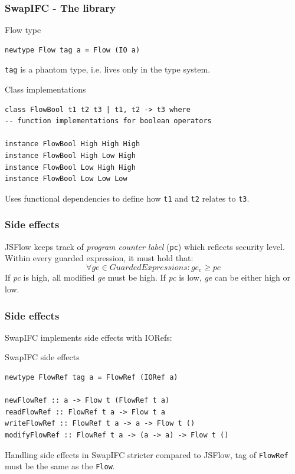 \documentclass{beamer}
\begin{document}
\begin{frame}[fragile]
  \frametitle{SwapIFC - The library}
  \begin{block}{Flow type}
\begin{verbatim}
newtype Flow tag a = Flow (IO a)
\end{verbatim}
  \end{block}
  {\tt tag} is a phantom type, i.e. lives only in the type system. \pause
  \begin{block}{Class implementations}
\begin{verbatim}
class FlowBool t1 t2 t3 | t1, t2 -> t3 where
-- function implementations for boolean operators

instance FlowBool High High High
instance FlowBool High Low High
instance FlowBool Low High High
instance FlowBool Low Low Low
\end{verbatim}
  \end{block}
  Uses functional dependencies to define how {\tt t1} and {\tt t2} relates to {\tt t3}.
\end{frame}


\begin{frame}
  \frametitle{Side effects}
  JSFlow keeps track of \emph{program counter label} ({\tt pc}) which reflects security level. \pause
  \newline
  Within every guarded expression, it must hold that:\[ \forall ge \in GuardedExpressions: ge_c \geq pc \] \pause
  If \emph{pc} is high, all modified \emph{ge} must be high. If \emph{pc} is low, \emph{ge} can be either high or low.
\end{frame}


\begin{frame}[fragile]
  \frametitle{Side effects}
  SwapIFC implements side effects with IORefs:
  \begin{block}{SwapIFC side effects}
\begin{verbatim}
newtype FlowRef tag a = FlowRef (IORef a)

newFlowRef :: a -> Flow t (FlowRef t a)
readFlowRef :: FlowRef t a -> Flow t a
writeFlowRef :: FlowRef t a -> a -> Flow t ()
modifyFlowRef :: FlowRef t a -> (a -> a) -> Flow t ()
\end{verbatim}
  \end{block}
  \pause
  Handling side effects in SwapIFC stricter compared to JSFlow, tag of {\tt FlowRef} must be the same as the {\tt Flow}.
\end{frame}
\end{document}
